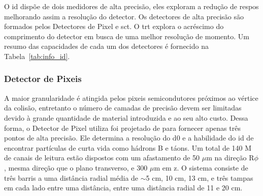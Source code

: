 O \gls{id} dispõe de dois medidores de alta precisão, eles exploram a redução 
de \gls{respos} melhorando assim a resolução do detector. Os detectores de alta 
precisão são formados pelos Detectores de Pixel e \gls{sct}. O \gls{trt}
explora o acréscimo do \gls{comprimento} do detector em busca de uma melhor
resolução de momento. Um resumo das capacidades de
cada um dos detectores é fornecido na Tabela~\ref{tab:info_id}.

\begin{table}
\centering
{}
\caption[Parâmetros do ID]
{Parâmetros do ID. As resoluções estão citadas em valores típicos (a
resolução verdadeira em cada detector depende do ângulo de impacto). Adaptado de
\cite{ATLAS_TDR}.}
\label{tab:info_id}
\end{table}

\subsubsection{Detector de Pixeis}
\label{sssec:pixeis}


A maior granularidade é atingida pelos pixeis semicondutores próximos
ao vértice da colisão, entretanto o número de camadas de precisão devem ser
limitadas devido à grande quantidade de material introduzida e ao seu alto
custo. Dessa forma, o Detector de Pixel utiliza foi projetado de para
fornecer apenas três pontos de alta precisão. Ele determina a resolução do
\gls{d0} e a habilidade do \gls{id} de encontrar partículas de curta
vida como hádrons B e táons. Um total de 140 M de canais de
leitura estão dispostos com um afastamento de 50 $\mu$m na direção R$\phi$, 
mesma direção que o plano transverso, e 300 $\mu$m em z. 
O sistema consiste de três barris a uma distância radial
média de $\sim$5 cm, 10 cm, 13 cm, e três tampas em cada lado entre uma
distância, entre uma distância radial de 11 e 20 cm.


